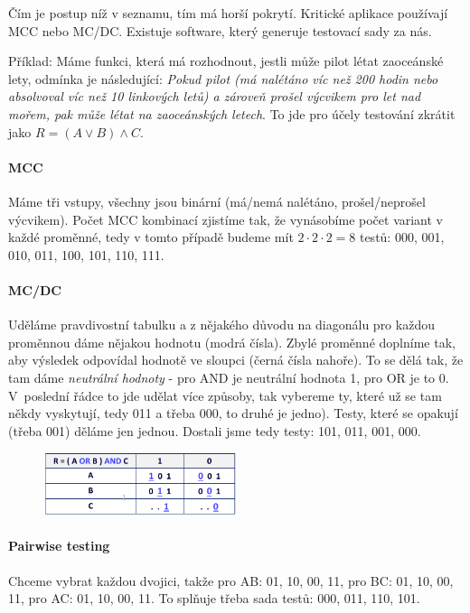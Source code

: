 Čím je postup níž v seznamu, tím má horší pokrytí. Kritické aplikace používají MCC nebo MC/DC. Existuje software, který generuje testovací sady za nás.

Příklad: Máme funkci, která má rozhodnout, jestli může pilot létat zaoceánské lety, odmínka je následující: \textit{Pokud pilot (má nalétáno víc než 200 hodin nebo absolvoval víc než 10 linkových letů) a zároveň prošel výcvikem pro let nad mořem, pak může létat na zaoceánských letech}. To jde pro účely testování zkrátit jako $R = ( A \vee B ) \wedge C$.

\paragraph{MCC} Máme tři vstupy, všechny jsou binární (má/nemá nalétáno, prošel/neprošel výcvikem). Počet MCC kombinací zjistíme tak, že vynásobíme počet variant v každé proměnné, tedy v tomto případě budeme mít $2\cdot 2 \cdot 2 = 8$ testů: 000, 001, 010, 011, 100, 101, 110, 111.

\paragraph{MC/DC} Uděláme pravdivostní tabulku a z nějakého důvodu na diagonálu pro každou proměnnou dáme nějakou hodnotu (modrá čísla). Zbylé proměnné doplníme tak, aby výsledek odpovídal hodnotě ve sloupci (černá čísla nahoře). To se dělá tak, že tam dáme \textit{neutrální hodnoty} - pro AND je neutrální hodnota 1, pro OR je to 0. V~poslední řádce to jde udělat více způsoby, tak vybereme ty, které už se tam někdy vyskytují, tedy 011 a třeba 000, to druhé je jedno). Testy, které se opakují (třeba 001) děláme jen jednou. Dostali jsme tedy testy: 101, 011, 001, 000.

\begin{figure}[ht!]
\centering
\includegraphics[width=0.5\textwidth]{oborove/ZKS/img/mcdc.png}
\end{figure}

\paragraph{Pairwise testing} Chceme vybrat každou dvojici, takže pro AB: 01, 10, 00, 11, pro BC: 01, 10, 00, 11, pro AC: 01, 10, 00, 11. To splňuje třeba sada testů: 000, 011, 110, 101. 


